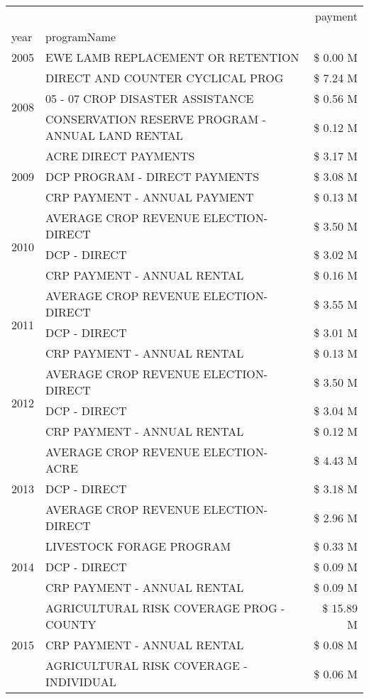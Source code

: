 \begin{tabular}{llr}
\toprule
 &  & payment \\
year & programName &  \\
\midrule
2005 & EWE LAMB REPLACEMENT OR RETENTION & \$ 0.00 M \\
\cline{1-3}
\multirow[t]{3}{*}{2008} & DIRECT AND COUNTER CYCLICAL PROG & \$ 7.24 M \\
 & 05 - 07 CROP DISASTER ASSISTANCE & \$ 0.56 M \\
 & CONSERVATION RESERVE PROGRAM - ANNUAL LAND RENTAL & \$ 0.12 M \\
\cline{1-3}
\multirow[t]{3}{*}{2009} & ACRE DIRECT PAYMENTS & \$ 3.17 M \\
 & DCP PROGRAM - DIRECT PAYMENTS & \$ 3.08 M \\
 & CRP PAYMENT - ANNUAL PAYMENT & \$ 0.13 M \\
\cline{1-3}
\multirow[t]{3}{*}{2010} & AVERAGE CROP REVENUE ELECTION-DIRECT & \$ 3.50 M \\
 & DCP - DIRECT & \$ 3.02 M \\
 & CRP PAYMENT - ANNUAL RENTAL & \$ 0.16 M \\
\cline{1-3}
\multirow[t]{3}{*}{2011} & AVERAGE CROP REVENUE ELECTION-DIRECT & \$ 3.55 M \\
 & DCP - DIRECT & \$ 3.01 M \\
 & CRP PAYMENT - ANNUAL RENTAL & \$ 0.13 M \\
\cline{1-3}
\multirow[t]{3}{*}{2012} & AVERAGE CROP REVENUE ELECTION-DIRECT & \$ 3.50 M \\
 & DCP - DIRECT & \$ 3.04 M \\
 & CRP PAYMENT - ANNUAL RENTAL & \$ 0.12 M \\
\cline{1-3}
\multirow[t]{3}{*}{2013} & AVERAGE CROP REVENUE ELECTION-ACRE & \$ 4.43 M \\
 & DCP - DIRECT & \$ 3.18 M \\
 & AVERAGE CROP REVENUE ELECTION-DIRECT & \$ 2.96 M \\
\cline{1-3}
\multirow[t]{3}{*}{2014} & LIVESTOCK FORAGE PROGRAM & \$ 0.33 M \\
 & DCP - DIRECT & \$ 0.09 M \\
 & CRP PAYMENT - ANNUAL RENTAL & \$ 0.09 M \\
\cline{1-3}
\multirow[t]{3}{*}{2015} & AGRICULTURAL RISK COVERAGE PROG - COUNTY & \$ 15.89 M \\
 & CRP PAYMENT - ANNUAL RENTAL & \$ 0.08 M \\
 & AGRICULTURAL RISK COVERAGE - INDIVIDUAL & \$ 0.06 M \\

\end{tabular}
